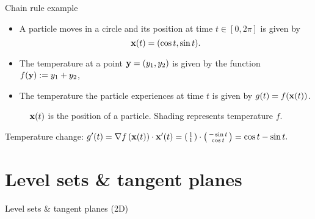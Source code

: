 {Chain rule example}



\begin{itemize}
    \item A particle moves in a circle and its position at time \(t\in [0,2\pi]\) is given by
          \[
              \mathbf{x}(t) = (\cos t, \sin t).
          \]
    \item  The temperature at a point \(\mathbf{y}=(y_1,y_2)\) is given by the function \(f(\mathbf{y}) := y_1 + y_2\),
    \item             The temperature the particle experiences at time \(t\) is given by \(g(t) = f (\mathbf{x}(t))\).
\end{itemize}




\begin{figure}
    \caption{\(\mathbf{x}(t)\) is the position of a particle. Shading represents temperature \(f\).}
\end{figure}




Temperature change:
\(
g'(t)
= \nabla f \left(\mathbf{x}(t)\right) \cdot \mathbf{x}'(t)
= \left(\begin{smallmatrix}
        1 \\
        1
    \end{smallmatrix}\right)
\cdot
\left( \begin{smallmatrix}
        -\sin t \\
        \cos t
    \end{smallmatrix}\right)
= \cos t - \sin t.
\)





\section{Level sets \& tangent planes}


 {Level sets \& tangent planes (2D)}




